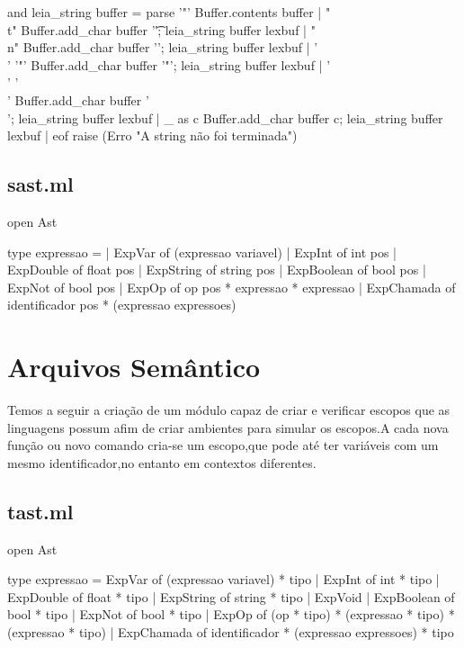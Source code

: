\documentclass[12pt,a4paper,twoside]{report}
\begin{document}
\begin{terminal}
and leia_string buffer = parse
   '"'      { Buffer.contents buffer}
| "\\t"     { Buffer.add_char buffer '\t'; leia_string buffer lexbuf }
| "\\n"     { Buffer.add_char buffer '\n'; leia_string buffer lexbuf }
| '\\' '"'  { Buffer.add_char buffer '"'; leia_string buffer lexbuf }
| '\\' '\\' { Buffer.add_char buffer '\\'; leia_string buffer lexbuf }
| _ as c    { Buffer.add_char buffer c; leia_string buffer lexbuf }
| eof       { raise (Erro "A string não foi terminada") }

\end{terminal}
\subsection{sast.ml}
\begin{terminal}
open Ast

type expressao =
  | ExpVar of (expressao variavel)
  | ExpInt of int pos
  | ExpDouble of float pos
  | ExpString of string pos
  | ExpBoolean of bool pos
  | ExpNot of bool pos
  | ExpOp of op pos * expressao * expressao
  | ExpChamada of identificador pos * (expressao expressoes)

\end{terminal}
\section{Arquivos Semântico}
Temos a seguir a criação de um módulo capaz de criar e verificar escopos que as linguagens possum afim de criar ambientes para simular os escopos.A cada nova função ou novo comando cria-se um escopo,que pode até ter variáveis com um mesmo identificador,no entanto em contextos diferentes. 
\subsection{tast.ml}
\begin{terminal}
open Ast

type expressao = ExpVar of (expressao variavel) * tipo
              | ExpInt of int * tipo
	      | ExpDouble of float * tipo
              | ExpString of string * tipo
  	      | ExpVoid
              | ExpBoolean of bool * tipo
              | ExpNot of  bool * tipo
              | ExpOp of (op * tipo) * (expressao * tipo) * (expressao * tipo)
              | ExpChamada of identificador * (expressao expressoes) * tipo
\end{terminal}
\end{document}
